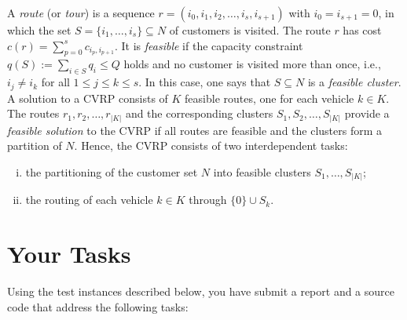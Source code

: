 A \emph{route} (or \emph{tour}) is a sequence
$r=(i_0,i_1,i_2,\ldots,i_s,i_{s+1})$ with $i_0=i_{s+1}=0$, in which the
set $S=\{i_1,\ldots,i_s\}\subseteq N$ of customers is visited. The route
$r$ has cost $c(r)=\sum_{p=0}^sc_{i_p,i_{p+1}}$. It is \emph{feasible}
if the capacity constraint $q(S):=\sum_{i\in S}q_i\leq Q$ holds and no
customer is visited more than once, i.e., $i_j\neq i_k$ for all $1\leq
j\leq k\leq s$. In this case, one says that $S\subseteq N$ is a
\emph{feasible cluster}. A solution to a CVRP consists of $K$ feasible
routes, one for each vehicle $k\in K$. The routes
$r_1,r_2,\ldots,r_{|K|}$ and the corresponding clusters
$S_1,S_2,\ldots,S_{|K|}$ provide a \emph{feasible solution} to the CVRP
if all routes are feasible and the clusters form a partition of
$N$. Hence, the CVRP consists of two interdependent tasks:
\begin{enumerate}[(i)]
\item the partitioning of the customer set $N$ into feasible clusters
  $S_1,\ldots,S_{|K|}$;
\item the routing of each vehicle $k\in K$ through $\{0\}\cup S_k$.
\end{enumerate}



\section{Your Tasks}
\medskip

Using the test instances described below, you have submit a report and a
source code that address the following tasks:


